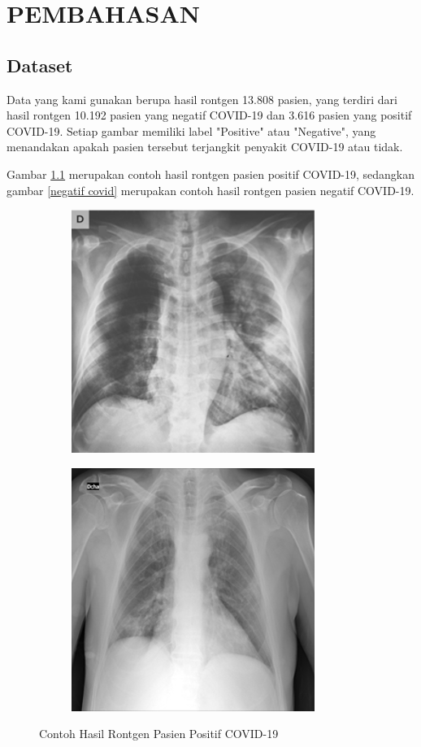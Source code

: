 \chapter{PEMBAHASAN}
\section{Dataset}
Data yang kami gunakan berupa hasil rontgen 13.808 pasien, yang terdiri dari hasil rontgen 10.192 pasien yang negatif COVID-19 dan 3.616 pasien yang positif COVID-19. Setiap gambar memiliki label "Positive" atau "Negative", yang menandakan apakah pasien tersebut terjangkit penyakit COVID-19 atau tidak.

Gambar \ref{positif covid} merupakan contoh hasil rontgen pasien positif COVID-19, sedangkan gambar \ref{negatif covid} merupakan contoh hasil rontgen pasien negatif COVID-19.

\begin{figure}
\centering
\begin{subfigure}{.5\textwidth}
  \centering
  \includegraphics[width=.6\linewidth]{pics/COVID-11.png}
\end{subfigure}%
\begin{subfigure}{.5\textwidth}
  \centering
  \includegraphics[width=.6\linewidth]{pics/COVID-12.png}
\end{subfigure}

\caption{Contoh Hasil Rontgen Pasien Positif COVID-19}
\label{positif covid}
\end{figure}

